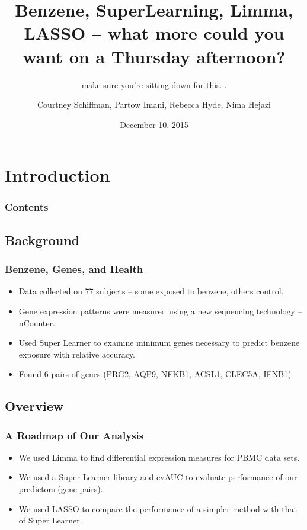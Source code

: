 \documentclass{beamer}
\title{Benzene, SuperLearning, Limma, LASSO -- what more could you want on a Thursday afternoon?}
\subtitle{make sure you're sitting down for this...}
\author{Courtney Schiffman, Partow Imani, Rebecca Hyde, Nima Hejazi}
\institute[UC Berkeley]{University of California, Berkeley}
\date{December 10, 2015}
\begin{document}
\frame{\titlepage}

\section[Outline]{}
\frame{\tableofcontents}


\section{Introduction}

\begin{frame}
	\frametitle{Contents}
	\tableofcontents[currentsection,currentsubsection,hideothersubsections,sectionstyle=show/shaded] 
\end{frame}


\subsection{Background}

\begin{frame}[fragile]
  	\frametitle{Benzene, Genes, and Health}
  		\begin{itemize}
  			\item Data collected on 77 subjects -- some exposed to benzene, others control.
			\item Gene expression patterns were measured using a new sequencing technology -- nCounter.
 			\item Used Super Learner to examine minimum genes necessary to predict benzene exposure with relative accuracy.
  			\item Found 6 pairs of genes (PRG2, AQP9, NFKB1, ACSL1, CLEC5A, IFNB1)
  		\end{itemize}
\end{frame}

\subsection{Overview}

\begin{frame}[fragile]
  	\frametitle{A Roadmap of Our Analysis}
 		\begin{itemize}
  			\item We used Limma to find differential expression measures for PBMC data sets.
 			\item We used a Super Learner library and cvAUC to evaluate performance of our predictors (gene pairs).
  			\item We used LASSO to compare the performance of a simpler method with that of Super Learner.
  		\end{itemize}
\end{frame}
\end{document}
